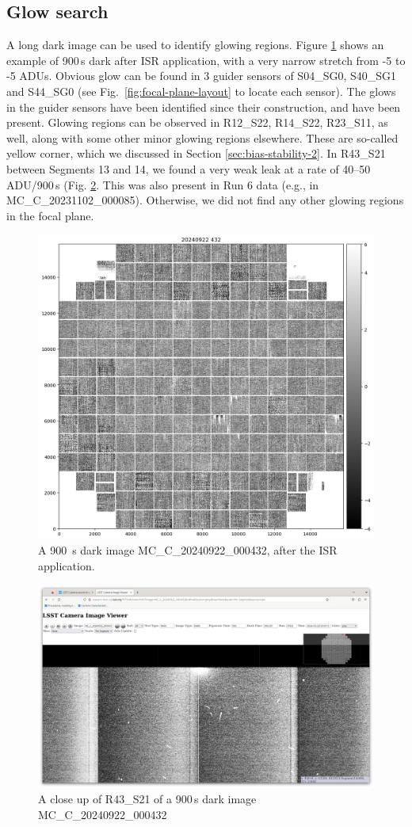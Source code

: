 \subsection{Glow search}
A long dark image can be used to identify glowing regions. Figure \ref{fig:glowsearch} shows an example of 900\,s dark after ISR application, with a very narrow stretch from -5 to -5 ADUs. 
Obvious glow can be found in 3 guider sensors of S04\_SG0, S40\_SG1 and S44\_SG0 (see Fig.~\ref{fig:focal-plane-layout} to locate each sensor). The glows in the guider sensors have been identified since their construction, and have been present.
Glowing regions can be observed in R12\_S22, R14\_S22, R23\_S11, as well, along with some other minor glowing regions elsewhere. These are so-called yellow corner, which we discussed in Section \ref{sec:bias-stability-2}.
In R43\_S21 between Segments 13 and 14, we found a very weak leak at a rate of 40--50\,ADU/900\,s (Fig. \ref{fig:glowsearch:closeup}. This was also present in Run 6 data (e.g., in MC\_C\_20231102\_000085).
Otherwise, we did not find any other glowing regions in the focal plane.

\begin{figure}
    \centering
    \includegraphics[width=0.5\linewidth]{figures/glowsearch/900sdark.png}
    \caption{A 900\, s dark image MC\_C\_20240922\_000432, after the ISR application.}
    \label{fig:glowsearch}
\end{figure}
\begin{figure}
    \centering
    \includegraphics[width=1.0\linewidth]{figures/glowsearch/R43S21.png}
    \caption{A close up of R43\_S21 of a 900\,s dark image MC\_C\_20240922\_000432}
    \label{fig:glowsearch:closeup}
\end{figure}

